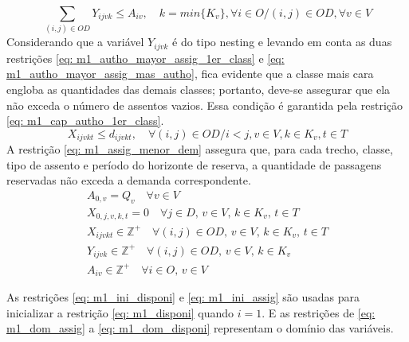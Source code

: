 \vspace{-1cm}

\begin{equation}
	\sum_{(i,j) \in OD} Y_{ijvk} \leq A_{iv}, \quad  k = min\{K_v\}, \forall i \in O / (i,j) \in OD,   \forall v \in V      \label{eq: m1_cap_autho_1er_class}
\end{equation}
Considerando que a variável $Y_{ijvk}$ é do tipo nesting e levando em conta as duas restrições \eqref{eq: m1_autho_mayor_assig_1er_class} e \eqref{eq: m1_autho_mayor_assig_mas_autho}, fica evidente que a classe mais cara engloba as quantidades das demais classes; portanto, deve-se assegurar que ela não exceda o número de assentos vazios. Essa condição é garantida pela restrição \eqref{eq: m1_cap_autho_1er_class}.
\begin{equation}
	X_{ijvkt} \leq d_{ijvkt},  \quad \forall (i,j) \in OD / i < j  ,v \in V, k \in K_v, t\in T  \label{eq: m1_assig_menor_dem}
\end{equation}
A restrição \eqref{eq: m1_assig_menor_dem} assegura que, para cada trecho, classe, tipo de assento e período do horizonte de reserva, a quantidade de passagens reservadas não exceda a demanda correspondente.
\allowdisplaybreaks
\begin{gather}
	A_{0,v} = Q_v \quad \forall v \in V \label{eq: m1_ini_disponi} \\
	X_{0,j,v,k,t} = 0 \quad \forall j \in D,\, v \in V,\, k \in K_v,\, t \in T \label{eq: m1_ini_assig} \\
	X_{ijvkt} \in \mathbb{Z}^+ \quad \forall(i,j) \in OD,\, v \in V,\, k \in K_v,\, t \in T \label{eq: m1_dom_assig} \\
	Y_{ijvk} \in \mathbb{Z}^+ \quad \forall(i,j) \in OD,\, v \in V,\, k \in K_v \label{eq: m1_dom_autho} \\
	A_{iv} \in \mathbb{Z}^+ \quad \forall i \in O,\, v \in V \label{eq: m1_dom_disponi}
\end{gather}

As restrições \eqref{eq: m1_ini_disponi} e \eqref{eq: m1_ini_assig} são usadas para inicializar a restrição \eqref{eq: m1_disponi} quando \(i = 1\). E as restrições de \eqref{eq: m1_dom_assig} a \eqref{eq: m1_dom_disponi} representam o domínio das variáveis.

